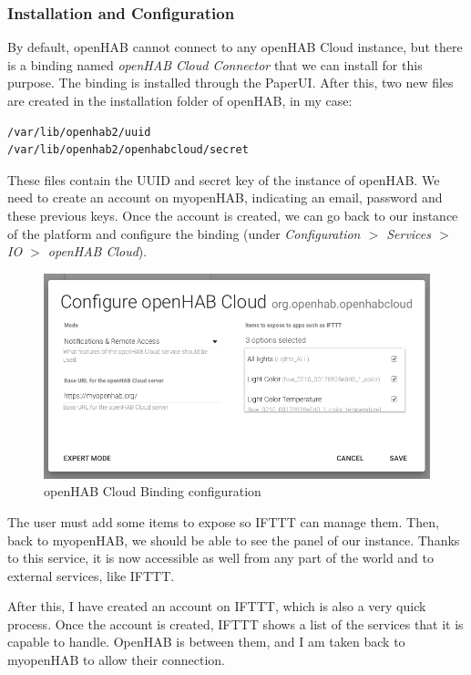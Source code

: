 \subsubsection{Installation and Configuration}
By default, openHAB cannot connect to any openHAB Cloud instance, but there is a binding named \textit{openHAB Cloud Connector}
that we can install for this purpose. The binding is installed through the PaperUI. After this, two new files are created in the installation
folder of openHAB, in my case:

\begin{lstlisting}[style=Consola]
/var/lib/openhab2/uuid
/var/lib/openhab2/openhabcloud/secret
\end{lstlisting}

These files contain the UUID and secret key of the instance of openHAB. We need to create an account on myopenHAB, indicating an
email, password and these previous keys. Once the account is created, we can go back to our instance of the platform and configure
the binding (under \textit{Configuration $>$ Services $>$ IO $>$ openHAB Cloud}).

\begin{figure}
	\centering
	\includegraphics[width=1\textwidth]{images/Chapter_06/openhab-cloud-binding-conf.png}
	\caption{openHAB Cloud Binding configuration}
	\label{fig:openhab-cloud-binding-conf}
\end{figure}

The user must add some items to expose so IFTTT can manage them. Then, back to myopenHAB, we should be able to see the panel
of our instance. Thanks to this service, it is now accessible as well from any part of the world and to external services, like IFTTT.

After this, I have created an account on IFTTT, which is also a very quick process. Once the account is created, IFTTT shows a list
of the services that it is capable to handle. OpenHAB is between them, and I am taken back to myopenHAB to allow their connection.

